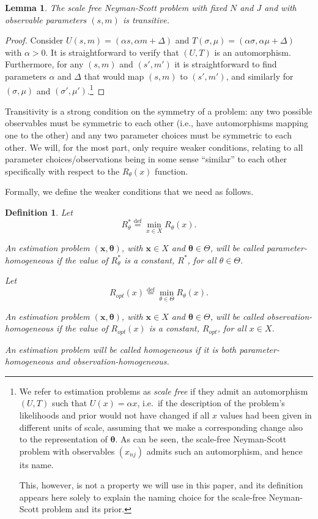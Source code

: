 \documentclass{IEEEtran}
\newcommand{\defeq}{\stackrel{\text{def}}{=}}
\newtheorem{lemma}{Lemma}
\newtheorem{defi}{Definition}
\begin{document}
\begin{lemma}\label{L:NStransitive}
The scale free Neyman-Scott problem with fixed $N$ and $J$ and with
observable parameters $(s,m)$ is transitive.
\end{lemma}

\begin{proof}
Consider $U(s,m)=(\alpha s,\alpha m+\Delta)$ and
$T(\sigma,\mu)=(\alpha \sigma,\alpha \mu+\Delta)$ with $\alpha> 0$.
It is straightforward to verify that $(U,T)$ is an automorphism.
Furthermore, for any $(s,m)$ and $(s',m')$
it is straightforward to find parameters $\alpha$ and $\Delta$ that would
map $(s,m)$ to $(s',m')$, and similarly for $(\sigma,\mu)$ and
$(\sigma',\mu')$.\footnote{We refer to estimation problems as \emph{scale free}
if they admit an
automorphism $(U,T)$ such that $U(x)=\alpha x$, i.e.\ if  the description of
the problem's likelihoods and prior would not have changed if all $x$ values
had been given in different units of scale, assuming that we make a
corresponding change also to the representation of $\boldsymbol{\theta}$.
As can be seen, the scale-free Neyman-Scott problem
with observables $(x_{nj})$ admits such an automorphism, and hence its name.

This, however, is not a property we will use in this paper, and its definition
appears here solely to explain the naming choice for the
scale-free Neyman-Scott problem and its prior.}
\end{proof}

Transitivity is a strong condition on the symmetry of a problem: any two
possible observables must be symmetric to each other (i.e., have automorphisms
mapping one to the other) and any two parameter choices must be symmetric to
each other. We will, for the most part, only require weaker conditions,
relating to all parameter choices/observations being in some sense ``similar''
to each other specifically with respect to the $R_{\theta}(x)$ function.

Formally, we define the weaker conditions that we need as follows.

\begin{defi}\label{D:homogeneous}
Let
\[
R^*_\theta\defeq\min_{x\in X} R_{\theta}(x).
\]

An estimation problem $(\mathbf{x},\boldsymbol{\theta})$, with
$\mathbf{x}\in X$ and $\boldsymbol{\theta}\in\Theta$, will be called
\emph{parameter-homogeneous} if the value of $R^*_\theta$
is a constant, $R^*$, for all $\theta\in\Theta$.

Let
\[
R_{\textit{opt}}(x)\defeq\min_{\theta\in \Theta} R_{\theta}(x).
\]

An estimation problem $(\mathbf{x},\boldsymbol{\theta})$, with
$\mathbf{x}\in X$ and $\boldsymbol{\theta}\in\Theta$, will be called
\emph{observation-homogeneous} if the value of $R_{\textit{opt}}(x)$
is a constant, $R_{\textit{opt}}$, for all $x \in X$.

An estimation problem will be called \emph{homogeneous} if it is both
parameter-homogeneous and observation-homogeneous.
\end{defi}
\end{document}
